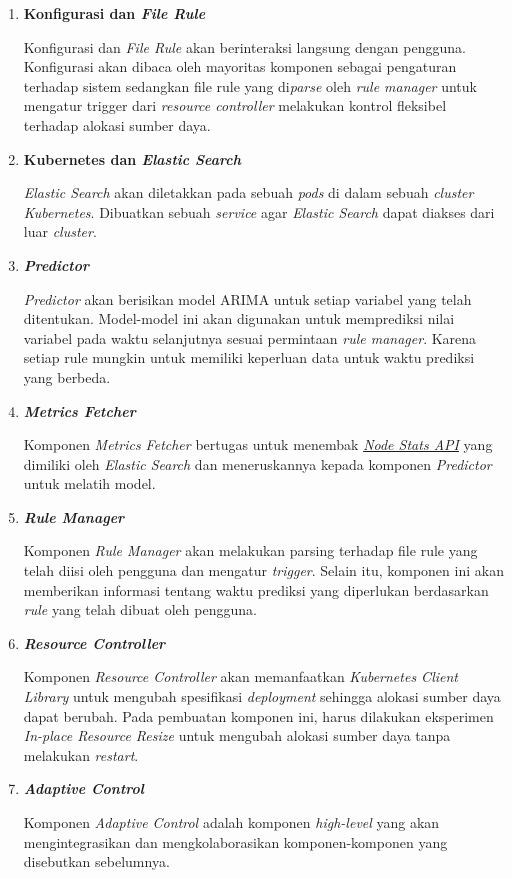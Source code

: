 \begin{enumerate}
    \item \textbf{Konfigurasi dan \textit{File Rule}}
    
    Konfigurasi dan \textit{File Rule} akan berinteraksi langsung dengan pengguna. Konfigurasi akan dibaca oleh mayoritas komponen sebagai pengaturan terhadap sistem sedangkan file rule yang di\textit{parse} oleh \textit{rule manager} untuk mengatur trigger dari \textit{resource controller} melakukan kontrol fleksibel terhadap alokasi sumber daya.

    \item \textbf{Kubernetes dan \textit{Elastic Search}}
    
    \textit{Elastic Search} akan diletakkan pada sebuah \textit{pods} di dalam sebuah \textit{cluster Kubernetes}. Dibuatkan sebuah \textit{service} agar \textit{Elastic Search} dapat diakses dari luar \textit{cluster}.
    
    \item \textbf{\textit{Predictor}}
    
    \textit{Predictor} akan berisikan model ARIMA untuk setiap variabel yang telah ditentukan. Model-model ini akan digunakan untuk memprediksi nilai variabel pada waktu selanjutnya sesuai permintaan \textit{rule manager}. Karena setiap rule mungkin untuk memiliki keperluan data untuk waktu prediksi yang berbeda.

    \item \textbf{\textit{Metrics Fetcher}}
    
    Komponen \textit{Metrics Fetcher} bertugas untuk menembak \href{https://www.elastic.co/guide/en/elasticsearch/reference/current/cluster-nodes-stats.html}{\textit{Node Stats API}} yang dimiliki oleh \textit{Elastic Search} dan meneruskannya kepada komponen \textit{Predictor} untuk melatih model.

    \item \textbf{\textit{Rule Manager}}
    
    Komponen \textit{Rule Manager} akan melakukan parsing terhadap file rule yang telah diisi oleh pengguna dan mengatur \textit{trigger}. Selain itu, komponen ini akan memberikan informasi tentang waktu prediksi yang diperlukan berdasarkan \textit{rule} yang telah dibuat oleh pengguna.

    \item \textbf{\textit{Resource Controller}}
    
    Komponen \textit{Resource Controller} akan memanfaatkan \textit{Kubernetes Client Library} untuk mengubah spesifikasi \textit{deployment} sehingga alokasi sumber daya dapat berubah. Pada pembuatan komponen ini, harus dilakukan eksperimen \textit{In-place Resource Resize} untuk mengubah alokasi sumber daya tanpa melakukan \textit{restart}.

    \item \textbf{\textit{Adaptive Control}}
    
    Komponen \textit{Adaptive Control} adalah komponen \textit{high-level} yang akan mengintegrasikan dan mengkolaborasikan komponen-komponen yang disebutkan sebelumnya.
\end{enumerate}